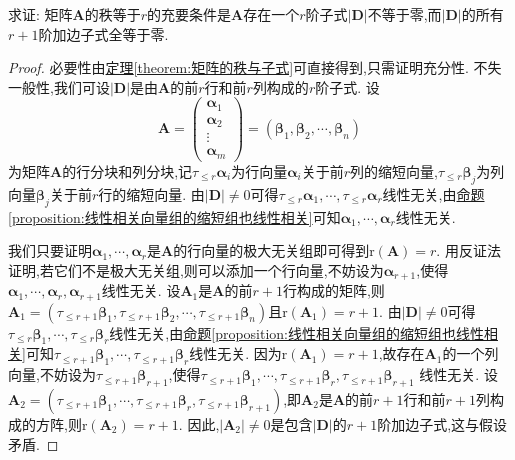\documentclass[../../main.tex]{subfiles}%
\begin{document}
\begin{proposition}\label{proposition:矩阵的秩与子式及其加边子式的关系}
求证: 矩阵\(\boldsymbol{A}\)的秩等于\(r\)的充要条件是\(\boldsymbol{A}\)存在一个\(r\)阶子式\(|\boldsymbol{D}|\)不等于零,而\(|\boldsymbol{D}|\)的所有\(r + 1\)阶加边子式全等于零.
\end{proposition}
\begin{proof}
必要性由\hyperref[theorem:矩阵的秩与子式]{定理\ref{theorem:矩阵的秩与子式}}可直接得到,只需证明充分性. 不失一般性,我们可设\(|\boldsymbol{D}|\)是由\(\boldsymbol{A}\)的前\(r\)行和前\(r\)列构成的\(r\)阶子式. 设
\[
\boldsymbol{A}=\begin{pmatrix}
\boldsymbol{\alpha}_1\\
\boldsymbol{\alpha}_2\\
\vdots\\
\boldsymbol{\alpha}_m
\end{pmatrix}=(\boldsymbol{\beta}_1,\boldsymbol{\beta}_2,\cdots,\boldsymbol{\beta}_n)
\]
为矩阵\(\boldsymbol{A}\)的行分块和列分块,记\(\tau_{\leqslant  r}\boldsymbol{\alpha}_i\)为行向量\(\boldsymbol{\alpha}_i\)关于前\(r\)列的缩短向量,\(\tau_{\leqslant  r}\boldsymbol{\beta}_j\)为列向量\(\boldsymbol{\beta}_j\)关于前\(r\)行的缩短向量. 由\(|\boldsymbol{D}|\neq0\)可得\(\tau_{\leqslant  r}\boldsymbol{\alpha}_1,\cdots,\tau_{\leqslant  r}\boldsymbol{\alpha}_r\)线性无关,由\hyperref[proposition:线性相关向量组的缩短组也线性相关]{命题\ref{proposition:线性相关向量组的缩短组也线性相关}}可知\(\boldsymbol{\alpha}_1,\cdots,\boldsymbol{\alpha}_r\)线性无关. 

我们只要证明\(\boldsymbol{\alpha}_1,\cdots,\boldsymbol{\alpha}_r\)是\(\boldsymbol{A}\)的行向量的极大无关组即可得到\(\mathrm{r}(\boldsymbol{A}) = r\). 用反证法证明,若它们不是极大无关组,则可以添加一个行向量,不妨设为\(\boldsymbol{\alpha}_{r + 1}\),使得\(\boldsymbol{\alpha}_1,\cdots,\boldsymbol{\alpha}_r,\boldsymbol{\alpha}_{r + 1}\)线性无关. 设\(\boldsymbol{A}_1\)是\(\boldsymbol{A}\)的前\(r + 1\)行构成的矩阵,则\(\boldsymbol{A}_1 = (\tau_{\leqslant  r + 1}\boldsymbol{\beta}_1,\tau_{\leqslant  r + 1}\boldsymbol{\beta}_2,\cdots,\tau_{\leqslant  r + 1}\boldsymbol{\beta}_n)\)且\(\mathrm{r}(\boldsymbol{A}_1)=r + 1\). 由\(|\boldsymbol{D}|\neq0\)可得\(\tau_{\leqslant  r}\boldsymbol{\beta}_1,\cdots,\tau_{\leqslant  r}\boldsymbol{\beta}_r\)线性无关,由\hyperref[proposition:线性相关向量组的缩短组也线性相关]{命题\ref{proposition:线性相关向量组的缩短组也线性相关}}可知\(\tau_{\leqslant  r + 1}\boldsymbol{\beta}_1,\cdots,\tau_{\leqslant  r + 1}\boldsymbol{\beta}_r\)线性无关. 因为\(\mathrm{r}(\boldsymbol{A}_1)=r + 1\),故存在\(\boldsymbol{A}_1\)的一个列向量,不妨设为\(\tau_{\leqslant  r + 1}\boldsymbol{\beta}_{r + 1}\),使得\(\tau_{\leqslant  r + 1}\boldsymbol{\beta}_1,\cdots,\tau_{\leqslant  r + 1}\boldsymbol{\beta}_r,\tau_{\leqslant  r + 1}\boldsymbol{\beta}_{r + 1}\)
线性无关. 设\(\boldsymbol{A}_2 = (\tau_{\leqslant  r + 1}\boldsymbol{\beta}_1,\cdots,\tau_{\leqslant  r + 1}\boldsymbol{\beta}_r,\tau_{\leqslant  r + 1}\boldsymbol{\beta}_{r + 1})\),即\(\boldsymbol{A}_2\)是\(\boldsymbol{A}\)的前\(r + 1\)行和前\(r + 1\)列构成的方阵,则\(\mathrm{r}(\boldsymbol{A}_2)=r + 1\). 因此,\(|\boldsymbol{A}_2|\neq0\)是包含\(|\boldsymbol{D}|\)的\(r + 1\)阶加边子式,这与假设矛盾.
\end{proof}
\end{document}
